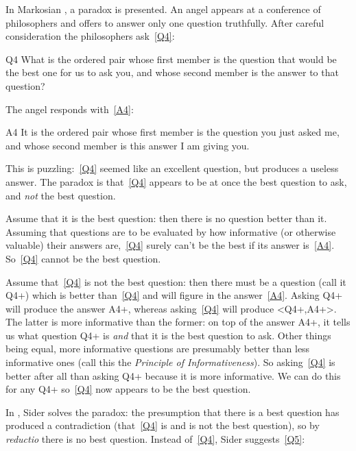 In Markosian \parencite[]{Markosian_1997}, a paradox is presented.
An angel appears at a conference of philosophers and offers to answer only one question truthfully.
After careful consideration the philosophers ask~\ref{Q4}\footnotemark:

	\begin{principle}{Q4}\label{Q4}
	What is the ordered pair whose first member is the question that would be the best one for us to ask you, and whose second member is the answer to that question? 
	\end{principle}

The angel responds with~\ref{A4}:

	\begin{principle}{A4}\label{A4}
	It is the ordered pair whose first member is the question you just asked me, and whose second member is this answer I am giving you. 
	\end{principle}

This is puzzling:~\ref{Q4} seemed like an excellent question, but produces a useless answer.
The paradox is that~\ref{Q4} appears to be at once the best question to ask, and \emph{not} the best question.

Assume that it is the best question: then there is no question better than it.
Assuming that questions are to be evaluated by how informative (or otherwise valuable) their answers are,~\ref{Q4} surely can't be the best if its answer is~\ref{A4}.
So~\ref{Q4} cannot be the best question.

Assume that~\ref{Q4} is not the best question: then there must be a question (call it Q4+) which is better than~\ref{Q4} and will figure in the answer~\ref{A4}.
Asking Q4+ will produce the answer A4+, whereas asking~\ref{Q4} will produce <Q4+,A4+>.
The latter is more informative than the former: on top of the answer A4+, it tells us what question Q4+ is \emph{and} that it is the best question to ask.
Other things being equal, more informative questions are presumably better than less informative ones (call this the \textit{Principle of Informativeness}).
So asking~\ref{Q4} is better after all than asking Q4+ because it is more informative.
We can do this for any Q4+ so~\ref{Q4} now appears to be the best question.

In \parencite[]{Sider1997}, Sider solves the paradox: the presumption that there is a best question has produced a contradiction (that~\ref{Q4} is and is not the best question), so by \textit{reductio} there is no best question.
Instead of~\ref{Q4}, Sider suggests~\ref{Q5}:


